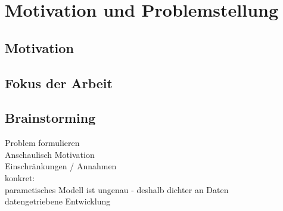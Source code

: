 \chapter{Motivation und Problemstellung}\label{ch:motivation}

\section{Motivation}


\section{Fokus der  Arbeit}



\section{Brainstorming}

Problem formulieren\\
Anschaulisch Motivation\\
Einschränkungen / Annahmen \\
konkret:\\
parametisches Modell ist ungenau - deshalb dichter an Daten\\
datengetriebene Entwicklung \\


\begin{deprecated}
\cite{davis93}


\end{deprecated}

